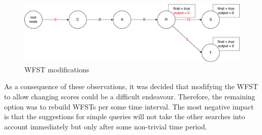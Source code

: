 \begin{itemize}
    \begin{figure}[htbp]
    \centering
    \includegraphics[width=145mm]{../img/wfst_modified.pdf}
    \caption{WFST modifications}
    \label{wfst_modified}
    \end{figure}

\end{itemize}

As a consequence of these observations, it was decided that modifying the WFST to allow changing scores could be a difficult
endeavour. Therefore, the remaining option was to rebuild WFSTs per some time interval. The most negative impact is that the
suggestions for simple queries will not take the other searches into account immediately but only after some non-trivial time period.

